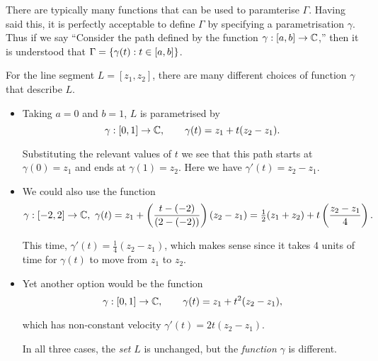 There are typically many functions that can be used to paramterise $\Gamma$.  
Having said this, it is perfectly acceptable to define $\Gamma$ by specifying a parametrisation $\gamma$.  Thus if we say ``Consider the path defined by the function $\gamma:[a,b] \to \mathbb{C}$,'' then it is understood that $\Gamma = \left\{ \gamma (t) : t \in [a,b] \right\}$.


\begin{example}
\label{e:path2}
For the line segment $L=[z_1,z_2]$, there are many different choices of function $\gamma$ that describe $L$.
\begin{itemize}
\item Taking $a=0$ and $b=1$, $L$ is parametrised by 
\[ \gamma :[0,1] \to \mathbb{C},\qquad \gamma(t)=z_1+t(z_2-z_1).\]
\begin{blankbox}
Substituting the relevant values of $t$ we see that this path starts at $\gamma(0)=z_1$ and ends at $\gamma(1)=z_2$. Here we have $\gamma'(t)=z_2-z_1$.
\end{blankbox}
\item We could also use the function 
\[
\gamma:[-2,2] \to \mathbb{C},\ \gamma(t) = z_1 + \left( \frac{t-(-2)}{(2-(-2))} \right) ( z_2-z_1) = \tfrac{1}{2} (z_1+z_2) + t \left( \frac{z_2-z_1}{4} \right).
\]
\begin{blankbox}
This time, $\gamma'(t) = \frac{1}{4} (z_2-z_1)$, which makes sense since it takes 4 units of time for $\gamma(t)$ to move from $z_1$ to $z_2$.
\end{blankbox}
\item Yet another option would be the function 
\[
\gamma: [0,1] \to \mathbb{C}, \qquad \gamma (t) = z_1 + t^2 (z_2-z_1),
\]
\begin{blankbox}
which has non-constant velocity $\gamma'(t) = 2t (z_2-z_1)$.

In all three cases, the \emph{set} $L$ is unchanged, but the \emph{function} $\gamma$ is different.
\end{blankbox}
\end{itemize}
\end{example}



